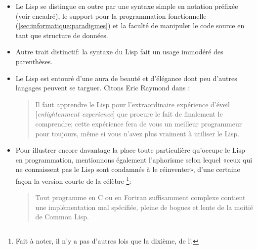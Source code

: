 \begin{itemize}
\item Le Lisp se distingue en outre par une syntaxe simple en notation
  préfixée (voir encadré), le support pour la programmation
  fonctionnelle (\autoref{sec:informatique:paradigmes}) et la faculté
  de manipuler le code source en tant que structure de données.
\item Autre trait distinctif: la syntaxe du Lisp fait un usage
  immodéré des parenthèses.
\item Le Lisp est entouré d'une aura de beauté et d'élégance dont peu
  d'autres langages peuvent se targuer. Citons Eric Raymond dans
  :
  \begin{quote}
    Il faut apprendre le Lisp pour l'extraordinaire expérience d'éveil
    [\emph{enlightenment experience}] que procure le fait de finalement
    le comprendre; cette expérience fera de vous un meilleur
    programmeur pour toujours, même si vous n'avez plus vraiment à
    utiliser le Lisp.
  \end{quote}
\item Pour illustrer encore davantage la place toute particulière
  qu'occupe le Lisp en programmation, mentionnons également
  l'aphorisme selon lequel «ceux qui ne connaissent pas le Lisp sont
  condamnés à le réinventer», d'une certaine façon la version courte
  de la célèbre
  \footnote{%
    Fait à noter, il n'y a pas d'autres lois que la dixième, de
    l'.}: %
  \begin{quote}
    Tout programme en C ou en Fortran suffisamment complexe contient
    une implémentation mal spécifiée, pleine de bogues et lente de la
    moitié de Common Lisp.
  \end{quote}
\end{itemize}

